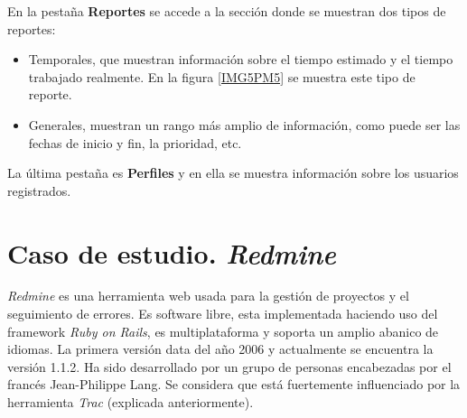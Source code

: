 \documentclass[11pt,a4paper,spanish,twoside]{report}
\begin{document}

        En la pestaña \textbf{Reportes} se accede a la sección donde se
        muestran dos tipos de reportes: 
        \begin{itemize}
          \item Temporales, que muestran información sobre el tiempo estimado
            y el tiempo trabajado realmente. En la figura \ref{IMG5PM5} se
            muestra este tipo de reporte.


          \item Generales, muestran un rango más amplio de información, como
            puede ser las fechas de inicio y fin, la prioridad, etc.
        \end{itemize}

        La última pestaña es \textbf{Perfiles} y en ella se muestra
        información sobre los usuarios registrados.
        

\chapter{Caso de estudio. \emph{Redmine}}

\emph{Redmine} es una herramienta web usada para la gestión de proyectos y el
seguimiento de errores. Es software libre, esta implementada haciendo uso
del framework \emph{Ruby on Rails}, es multiplataforma y soporta un amplio
abanico de idiomas. La primera versión data del año 2006 y actualmente se
encuentra la versión 1.1.2. Ha sido desarrollado por un grupo de personas
encabezadas por el francés Jean-Philippe Lang. Se considera que está
fuertemente influenciado por la herramienta \emph{Trac} (explicada
anteriormente).
\end{document}
